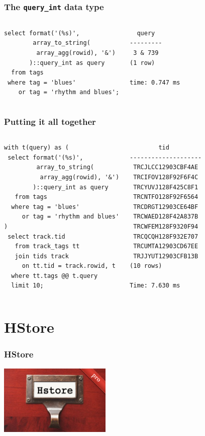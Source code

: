 \documentclass{beamer}
\begin{document}
\begin{frame}[fragile]
  \frametitle{The \texttt{query\_int} data type}

  \vfill

\begin{columns}
\begin{verbatim}
select format('(%s)',
        array_to_string(
         array_agg(rowid), '&')
       )::query_int as query
  from tags
 where tag = 'blues'
    or tag = 'rhythm and blues';
\end{verbatim}  
\begin{verbatim}
  query  
---------
 3 & 739
(1 row)

time: 0.747 ms
\end{verbatim}  
\end{columns}
\end{frame}

\begin{frame}[fragile]
  \frametitle{Putting it all together}

\begin{columns}
\begin{verbatim}
with t(query) as (
 select format('(%s)',
         array_to_string(
          array_agg(rowid), '&')
        )::query_int as query
   from tags
  where tag = 'blues'
     or tag = 'rhythm and blues'
)
 select track.tid
   from track_tags tt
   join tids track
     on tt.tid = track.rowid, t
  where tt.tags @@ t.query
  limit 10;
\end{verbatim}  
\begin{verbatim}
        tid         
--------------------
 TRCJLCC12903CBF4AE
 TRCIFOV128F92F6F4C
 TRCYUVJ128F425C8F1
 TRCNTFO128F92F6564
 TRCDRGT12903CE64BF
 TRCWAED128F42A837B
 TRCWFEM128F9320F94
 TRCQCQH128F932E707
 TRCUMTA12903CD67EE
 TRJJYUT12903CFB13B
(10 rows)

Time: 7.630 ms
\end{verbatim}  
\end{columns}
\end{frame}

\section{HStore}

\begin{frame}[fragile]
  \frametitle{HStore}

\begin{center}
  \includegraphics[height=9em]{hstore.png}
\end{center}
\end{frame}
\end{document}
